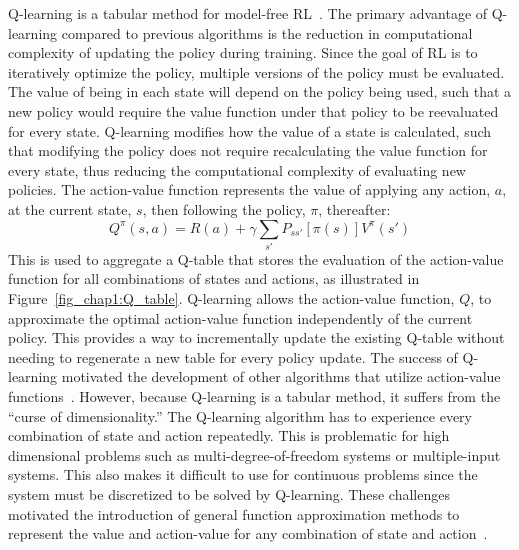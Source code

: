 Q-learning is a tabular method for model-free RL~\cite{Watkins:1989a,Watkins:1992a,Clifton:2020a}.
%
The primary advantage of Q-learning compared to previous algorithms is the reduction in computational complexity of updating the policy during training.
%
Since the goal of RL is to iteratively optimize the policy, multiple versions of the policy must be evaluated. The value of being in each state will depend on the policy being used, such that a new policy would require the value function under that policy to be reevaluated for every state. Q-learning modifies how the value of a state is calculated, such that modifying the policy does not require recalculating the value function for every state, thus reducing the computational complexity of evaluating new policies. The action-value function represents the value of applying any action, $a$, at the current state, $s$, then following the policy, $\pi$, thereafter:
%
\begin{equation}
Q^\pi(s,a) = R(a)+\gamma\sum_{s'}P_{ss'}[\pi(s)]V^{\pi}(s')
\end{equation}
%
This is used to aggregate a Q-table that stores the evaluation of the action-value function for all combinations of states and actions, as illustrated in Figure~\ref{fig_chap1:Q_table}.
Q-learning allows the action-value function, $Q$, to approximate the optimal action-value function independently of the current policy.
This provides a way to incrementally update the existing Q-table without needing to regenerate a new table for every policy update.
%
%
The success of Q-learning motivated the development of other algorithms that utilize action-value functions~\cite{Jang:2019a}.
%
However, because Q-learning is a tabular method, it suffers from the ``curse of dimensionality.'' The Q-learning algorithm has to experience every combination of state and action repeatedly. This is problematic for high dimensional problems such as multi-degree-of-freedom systems or multiple-input systems. This also makes it difficult to use for continuous problems since the system must be discretized to be solved by Q-learning. These challenges motivated the introduction of general function approximation methods to represent the value and action-value for any combination of state and action~\cite{Baird:1995a,Xu:2014a}.

